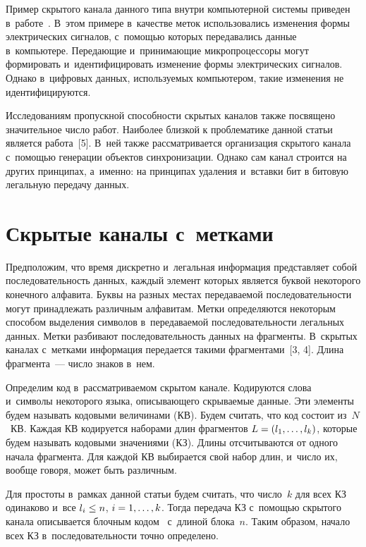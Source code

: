 \begin{multicols}{2}
  Пример скрытого канала данного типа внут\-ри компьютерной системы 
приведен в~работе~\cite{3-gru}. В~этом примере в~качестве меток 
использовались изменения формы электрических сигналов, с~помощью 
которых передавались данные в~компьютере. Передающие и~принимающие 
микропро\-цессоры могут формировать и~идентифицировать изменение формы 
электрических сигналов. Однако в~цифровых данных, используемых 
компьютером, такие изменения не идентифицируются. 
  
  Исследованиям пропускной способности скрытых каналов также посвящено 
значительное число работ. Наиболее близкой к проблематике данной статьи 
является работа~[5]. В~ней также рассматривается организация скрытого 
канала с~помощью генерации объектов синхронизации. Однако сам канал 
строится на других принципах, а~именно: на принципах удаления и~вставки бит 
в битовую легальную передачу данных. 
  
\section{Скрытые каналы с~метками}
  
  Предположим, что время дискретно и~легальная информация представляет 
собой последовательность данных, каждый элемент которых является буквой 
некоторого конечного алфавита. Буквы на разных местах передаваемой 
последовательности могут принадлежать различным алфавитам. Метки 
определяются некоторым способом выделения символов в~передаваемой 
последовательности легальных данных. Метки разбивают последовательность 
данных на фрагменты. В~скрытых каналах с~метками информация передается 
такими фрагментами~[3, 4]. Длина фрагмента~--- число знаков в~нем. 
  
  Определим код в~рассматриваемом скрытом канале. Кодируются слова 
и~символы некоторого языка, описывающего скрываемые данные. Эти 
элементы будем называть кодовыми величинами (КВ). Будем считать, что код 
состоит из~$N$~КВ. Каждая КВ кодируется наборами длин 
фрагментов $L\hm= (l_1,\ldots, l_k)$, которые будем называть кодовыми 
значениями (КЗ). Длины отсчитываются от одного начала фрагмента. Для 
каждой КВ выбирается свой набор длин, и~число их, вообще говоря, может 
быть различным. 
  
  Для простоты в~рамках данной статьи будем считать, что число~$k$ для всех 
КЗ одинаково и~все $l_i\hm\leq n$, $i\hm= 1,\ldots, k$. Тогда передача КЗ 
с~помощью скрытого канала описывается блочным кодом~\cite{6-gru} 
с~длиной блока~$n$. Таким образом, начало всех КЗ в~последовательности 
точно определено. 
  

\end{multicols}
